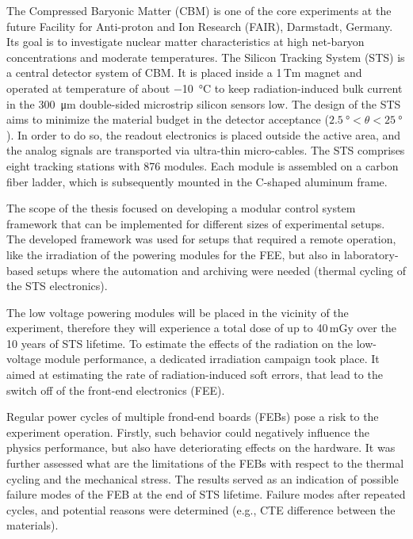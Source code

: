The Compressed Baryonic Matter (CBM) is one of the core experiments at the future Facility for Anti-proton and Ion Research (FAIR), Darmstadt, Germany. Its goal is to investigate nuclear matter characteristics at high net-baryon concentrations and moderate temperatures. The Silicon Tracking System (STS) is a central detector system of CBM. It is placed inside a 1\,Tm magnet and operated at temperature of about \SI{-10}{\celsius} to keep radiation-induced bulk current in the \SI{300}{\micro\metre} double-sided microstrip silicon sensors low. The design of the STS aims to minimize the material budget in the detector acceptance ($\SI{2.5}{\degree} < \theta < \SI{25}{\degree}$). In order to do so, the readout electronics is placed outside the active area, and the analog signals are transported via ultra-thin micro-cables. The STS comprises eight tracking stations with 876 modules. Each module is assembled on a carbon fiber ladder, which is subsequently mounted in the C-shaped aluminum frame. 

The scope of the thesis focused on developing a modular control system framework that can be implemented for different sizes of experimental setups. The developed framework was used for setups that required a remote operation, like the irradiation of the powering modules for the \gls{FEE}, but also in laboratory-based setups where the automation and archiving were needed (thermal cycling of the \gls{STS} electronics).

The low voltage powering modules will be placed in the vicinity of the experiment, therefore they will experience a total dose of up to 40\,mGy over the 10 years of \gls{STS} lifetime. To estimate the effects of the radiation on the low-voltage module performance, a dedicated irradiation campaign took place. It aimed at estimating the rate of radiation-induced soft errors, that lead to the switch off of the front-end electronics (\gls{FEE}).

Regular power cycles of multiple frond-end boards (\glspl{FEB}) pose a risk to the experiment operation.  Firstly, such behavior could negatively influence the physics performance, but also have deteriorating effects on the hardware. It was further assessed what are the limitations of the \glspl{FEB} with respect to the thermal cycling and the mechanical stress. The results served as an indication of possible failure modes of the \gls{FEB} at the end of \gls{STS} lifetime. Failure modes after repeated cycles, and potential reasons were determined (e.g., \gls{CTE} difference between the materials). 

